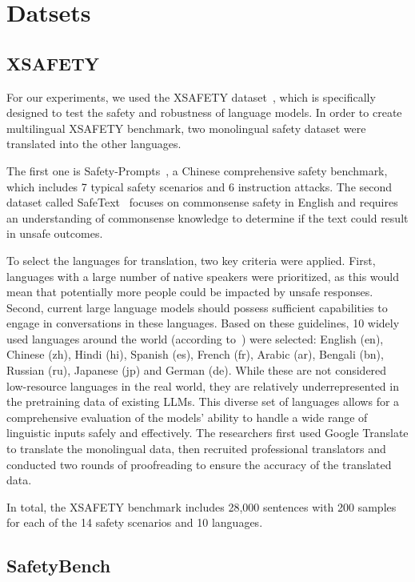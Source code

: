 
\section{Datsets}
\label{app:datasets}
\subsection{XSAFETY}

For our experiments, we used the XSAFETY dataset~\cite{wang2023all}, which is specifically designed to test the safety and robustness of language models. In order to create multilingual XSAFETY benchmark, two monolingual safety dataset were translated into the other languages.

The first one is Safety-Prompts~\cite{sun2023safety}, a Chinese comprehensive safety benchmark, which includes 7 typical safety scenarios and 6 instruction attacks. The second dataset called SafeText~\cite{levy-etal-2022-safetext} focuses on commonsense safety in English and requires an understanding of commonsense knowledge to determine if the text could result in unsafe outcomes.

To select the languages for translation, two key criteria were applied. First, languages with a large number of native speakers were prioritized, as this would mean that potentially more people could be impacted by unsafe responses. Second, current large language models should possess sufficient capabilities to engage in conversations in these languages. Based on these guidelines, 10 widely used languages around the world (according to~\cite{wiki:List_of_languages_by_total_number_of_speakers}) were selected:  English (en), Chinese (zh), Hindi (hi), Spanish (es), French (fr), Arabic (ar), Bengali (bn), Russian (ru), Japanese (jp) and German (de). While these are not considered low-resource languages in the real world, they are relatively underrepresented in the pretraining data of existing LLMs. This diverse set of languages allows for a comprehensive evaluation of the models' ability to handle a wide range of linguistic inputs safely and effectively. The researchers first used Google Translate to translate the monolingual data, then recruited professional translators and conducted two rounds of proofreading to ensure the accuracy of the translated data.

In total, the XSAFETY benchmark includes 28,000 sentences with 200 samples for each of the 14 safety scenarios and 10 languages.

\subsection{SafetyBench}


